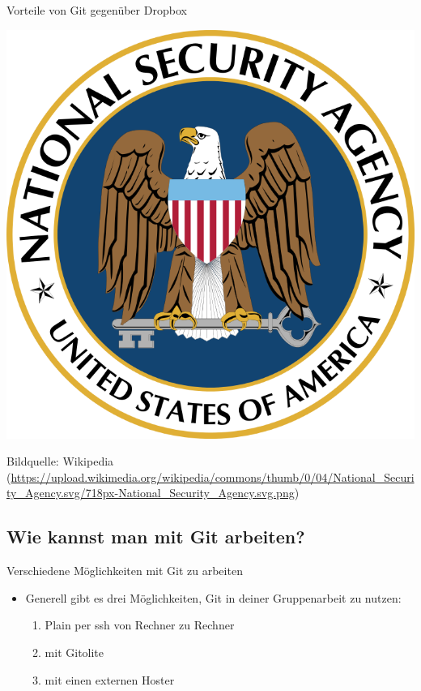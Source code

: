 \documentclass{beamer}
\begin{document}
\begin{frame}{Vorteile von Git gegenüber Dropbox}
	\begin{center}
		\includegraphics[height=0.7\textheight]{nsa.png}
	\end{center}
	{\scriptsize Bildquelle: Wikipedia (\url{https://upload.wikimedia.org/wikipedia/commons/thumb/0/04/National_Security_Agency.svg/718px-National_Security_Agency.svg.png})}
\end{frame}

\subsection{Wie kannst man mit Git arbeiten?}
\begin{frame}{Verschiedene Möglichkeiten mit Git zu arbeiten}
	\begin{itemize}
		\item Generell gibt es drei Möglichkeiten, Git in deiner Gruppenarbeit zu nutzen:
			\begin{enumerate}
				\item Plain per ssh von Rechner zu Rechner
				\item mit Gitolite
				\item mit einen externen Hoster
			\end{enumerate}
	\end{itemize}
\end{frame}
\end{document}
